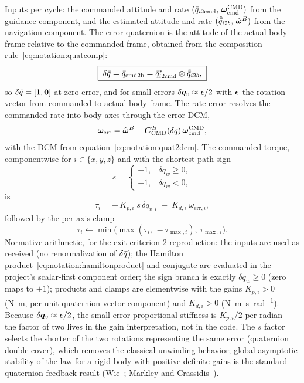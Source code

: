 Inputs per cycle: the commanded attitude and rate
$(\bar{q}_{i2\mathrm{cmd}},\, \bm{\omega}_{\mathrm{cmd}}^{\mathrm{CMD}})$
from the guidance component, and the estimated attitude and rate
$(\hat{\bar{q}}_{i2b},\, \hat{\bm{\omega}}^{B})$ from the navigation
component. The error quaternion is the attitude of the actual body
frame relative to the commanded frame, obtained from the composition
rule~\eqref{eq:notation:quatcomp}:
\begin{equation}
  \boxed{\;
  \delta\bar{q} = \bar{q}_{\mathrm{cmd2b}}
    = \bar{q}_{i2\mathrm{cmd}}^{*} \otimes \hat{\bar{q}}_{i2b} ,
  \;}
  \label{eq:gnc:deltaq}
\end{equation}
so $\delta\bar{q} = [1, \bm{0}]$ at zero error, and for small errors
$\delta\bm{q}_v \approx \bm{\epsilon}/2$ with $\bm{\epsilon}$ the
rotation vector from commanded to actual body frame. The rate error
resolves the commanded rate into body axes through the error DCM,
\begin{equation}
  \bm{\omega}_{\mathrm{err}} = \hat{\bm{\omega}}^{B}
    - \bm{C}_{\mathrm{CMD}}^{B}(\delta\bar{q})\,
      \bm{\omega}_{\mathrm{cmd}}^{\mathrm{CMD}} ,
  \label{eq:gnc:werr}
\end{equation}
with the DCM from equation~\eqref{eq:notation:quat2dcm}. The commanded
torque, componentwise for $i \in \{x, y, z\}$ and with the shortest-path
sign
\begin{equation}
  s = \begin{cases} +1, & \delta q_w \ge 0,\\ -1, & \delta q_w < 0,
      \end{cases}
  \label{eq:gnc:sign}
\end{equation}
is
\begin{equation}
  \boxed{\;
  \tau_i = -\,K_{p,i}\; s\,\delta q_{v,i}
           \;-\; K_{d,i}\; \omega_{\mathrm{err},i} ,
  \;}
  \label{eq:gnc:pd}
\end{equation}
followed by the per-axis clamp
\begin{equation}
  \tau_i \leftarrow \min\bigl(\max(\tau_i,\, -\tau_{\max,i}),\,
    \tau_{\max,i}\bigr).
  \label{eq:gnc:sat}
\end{equation}
Normative arithmetic, for the exit-criterion-2 reproduction: the inputs
are used as received (no renormalization of $\delta\bar{q}$); the
Hamilton product~\eqref{eq:notation:hamiltonproduct} and conjugate are
evaluated in the project's scalar-first component order; the sign
branch is exactly $\delta q_w \ge 0$ (zero maps to $+1$); products and
clamps are elementwise with the gains $K_{p,i} > 0$
(\unit{\newton\metre}, per unit quaternion-vector component) and
$K_{d,i} > 0$ (\unit{\newton\metre\second\per\radian}). Because
$\delta\bm{q}_v \approx \bm{\epsilon}/2$, the small-error proportional
stiffness is $K_{p,i}/2$ per radian --- the factor of two lives in the
gain interpretation, not in the code. The $s$ factor selects the
shorter of the two rotations representing the same error (quaternion
double cover), which removes the classical unwinding behavior; global
asymptotic stability of the law for a rigid body with positive-definite
gains is the standard quaternion-feedback result
(Wie~\cite{wie2008}; Markley and Crassidis~\cite{markley2014}).

